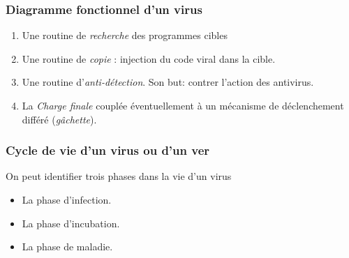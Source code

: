 \documentclass{beamer}
\newcommand{\enlight}[1]{\textit{\color{blue}#1}}
\begin{document}
\begin{frame}
\frametitle{Diagramme fonctionnel d'un virus }

\begin{enumerate}
\item Une routine de \enlight{recherche} des programmes cibles
\medskip
\item Une routine de \enlight{copie} : injection du code viral dans la cible.
  \medskip
\item Une routine d'\enlight{anti-détection}. Son but: contrer l'action des antivirus.
  \medskip
\item La \enlight{Charge finale} couplée éventuellement à un mécanisme de déclenchement différé (\enlight{gâchette}).%
\end{enumerate}
\end{frame}


\begin{frame}
\frametitle{Cycle de vie d'un virus ou d'un ver}

On peut identifier trois phases dans la vie d'un virus
\begin{itemize}
\item La phase d'infection.
\item La phase d'incubation.
\item La phase de maladie.
\end{itemize}

\end{frame}
\end{document}
